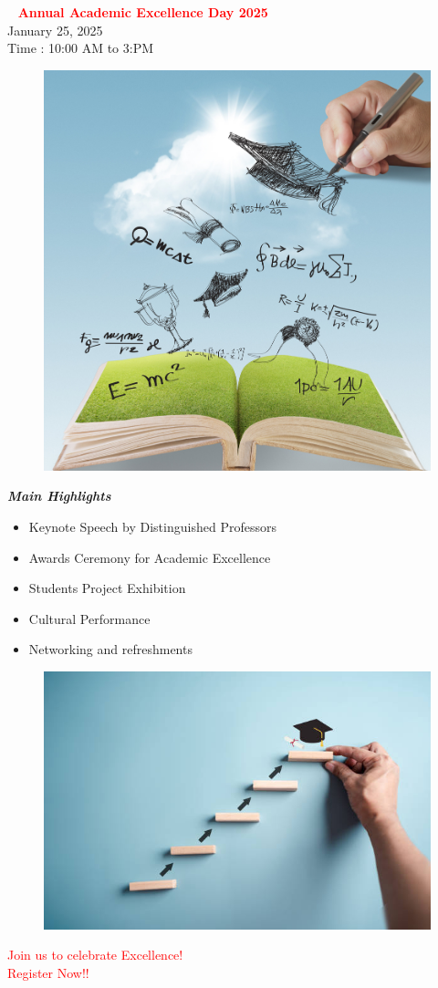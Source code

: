 \documentclass[]{article}
\begin{document}
	\
	\centering
	\huge \textbf{ \textcolor{red}{Annual Academic Excellence Day 2025}}
\\
\vspace{0.2in}
\large January 25, 2025
\\
\vspace{0.2in}
\small Time : 10:00 AM to 3:PM
\\
\begin{figure}[h]
	\centering
	\includegraphics[width=0.2\linewidth]{Academic_excellence.jpg}
	\label{fig:enter-label}
\end{figure}

\vspace{0.3in}
\huge{\textbf {\textit{Main Highlights}}}
\vspace{0.3in}
\begin{itemize}{}
	\item  {Keynote Speech by Distinguished Professors}
	
	\item  {Awards Ceremony for Academic Excellence}
	\item Students Project Exhibition
	\item Cultural Performance
	\item Networking and refreshments
\end{itemize}
\begin{figure}[h]
	\centering
	\includegraphics[width=0.2\linewidth]{adc.jpg}

	
\end{figure} 
\textcolor{red}{Join us to celebrate Excellence! }
\\
\huge  \textcolor{red}{Register Now!!}
\end{document}
